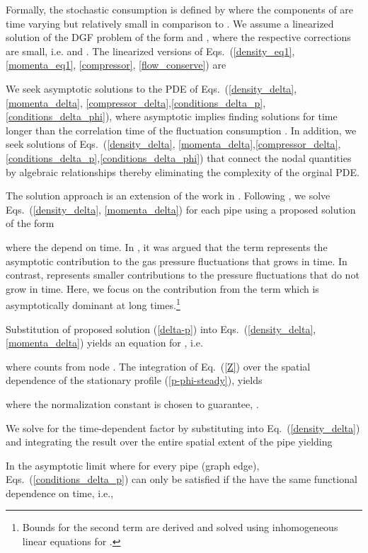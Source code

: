 \documentclass[10pt, conference, compsocconf]{IEEEtran}
\begin{document}
Formally, the stochastic consumption is defined by  where the components of  are time varying but relatively small in comparison to . We assume a linearized solution of the DGF problem of the form  and ,  where the respective corrections are small, i.e.  and . The linearized versions of Eqs.~(\ref{density_eq1}, \ref{momenta_eq1}, \ref{compressor}, \ref{flow_conserve}) are

We seek asymptotic solutions to the PDE of Eqs.~(\ref{density_delta}, \ref{momenta_delta}, \ref{compressor_delta},\ref{conditions_delta_p},\ref{conditions_delta_phi}), where asymptotic implies finding solutions for time  longer than the correlation time of the fluctuation consumption . In addition, we seek solutions of Eqs.~(\ref{density_delta}, \ref{momenta_delta},\ref{compressor_delta},\ref{conditions_delta_p},\ref{conditions_delta_phi}) that connect the nodal quantities by algebraic relationships thereby eliminating the complexity of the orginal PDE.

The solution approach is an extension of the work in \cite{14CLB}.  Following \cite{14CLB}, we solve Eqs.~(\ref{density_delta}, \ref{momenta_delta}) for each pipe using a proposed solution of the form

where the  depend on time. In \cite{14CLB}, it was argued that the  term represents the asymptotic contribution to the  gas pressure fluctuations that grows in time.  In contrast,  represents smaller contributions to the pressure fluctuations that do not grow in time. Here, we focus on the contribution from the  term which is asymptotically dominant at long times.\footnote{Bounds for the second term are derived and solved using inhomogeneous linear equations for .}

Substitution of proposed solution (\ref{delta-p}) into Eqs.~(\ref{density_delta}, \ref{momenta_delta}) yields an equation for , i.e.

where  counts  from node . The integration of Eq.~(\ref{Z}) over the spatial dependence of the stationary profile (\ref{p-phi-steady}),  yields

where the normalization constant is chosen to guarantee, .

We solve for the time-dependent factor  by substituting    into Eq.~(\ref{density_delta}) and integrating the result over the entire spatial extent of the pipe  yielding


In the asymptotic limit where    for every pipe (graph edge), Eqs.~(\ref{conditions_delta_p}) can only be satisfied if the  have the same functional dependence on time, i.e.,
\end{document}

